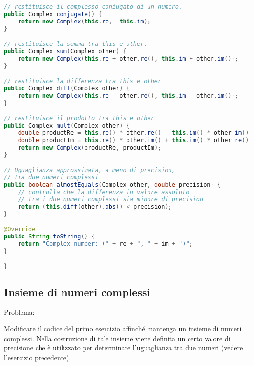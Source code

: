 \documentclass{article}
\begin{document}
\begin{lstlisting}[language=Java,escapechar=|]
// restituisce il complesso coniugato di un numero.
public Complex conjugate() {
	return new Complex(this.re, -this.im);
}

// restituisce la somma tra this e other.
public Complex sum(Complex other) {
	return new Complex(this.re + other.re(), this.im + other.im());
}

// restituisce la differenza tra this e other
public Complex diff(Complex other) {
	return new Complex(this.re - other.re(), this.im - other.im());
}

// restituisce il prodotto tra this e other
public Complex mult(Complex other) {
	double productRe = this.re() * other.re() - this.im() * other.im();
	double productIm = this.re() * other.im() + this.im() * other.re();
	return new Complex(productRe, productIm);
}

// Uguaglianza approssimata, a meno di precision,
// tra due numeri complessi
public boolean almostEquals(Complex other, double precision) {
	// controlla che la differenza in valore assoluto
	// tra i due numeri complessi sia minore di precision
	return (this.diff(other).abs() < precision);
}

@Override
public String toString() {
	return "Complex number: (" + re + ", " + im + ")";
}

}
\end{lstlisting}


\subsection{Insieme di numeri complessi}

Problema:

Modificare il codice del primo esercizio affinché mantenga un insieme
di numeri complessi.
Nella costruzione di tale insieme viene definita un certo valore di precisione
che è utilizzato per determinare l'uguaglianza tra due numeri (vedere l'esercizio precedente).
\end{document}
